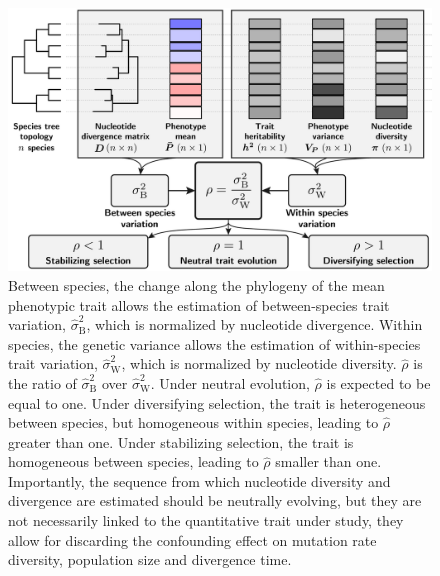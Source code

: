 \documentclass{article}
\newcommand{\RateBetween}{\sigma^2_{\mathrm{B}}}
\newcommand{\RateWhithin}{\sigma^2_{\mathrm{W}}}
\newcommand{\EstRateBetween}{\widehat{\sigma}^2_{\mathrm{B}}}
\newcommand{\EstRateWhithin}{\widehat{\sigma}^2_{\mathrm{W}}}
\newcommand{\NI}{\rho}
\newcommand{\EstNI}{\widehat{\rho}}
\providecommand{\DIFaddtex}[1]{{\protect\color{blue}\uwave{#1}}} %
\providecommand{\DIFdeltex}[1]{{\protect\color{red}\sout{#1}}}                      %
\providecommand{\DIFaddFL}[1]{\DIFadd{#1}} %
\providecommand{\DIFdelFL}[1]{\DIFdel{#1}} %
\providecommand{\DIFaddbeginFL}{} %
\providecommand{\DIFaddendFL}{} %
\providecommand{\DIFdelbeginFL}{} %
\providecommand{\DIFdelendFL}{} %
\providecommand{\DIFadd}[1]{\texorpdfstring{\DIFaddtex{#1}}{#1}} %
\providecommand{\DIFdel}[1]{\texorpdfstring{\DIFdeltex{#1}}{}} %
\newcommand{\DIFscaledelfig}{0.5}
\newlength{\DIFdelgraphicswidth} %
\newlength{\DIFdelgraphicsheight} %
\newcommand{\DIFaddincludegraphics}[2][]{{\color{blue}\fbox{\DIFOincludegraphics[#1]{#2}}}} %
\newcommand{\DIFdelincludegraphics}[2][]{%
\sbox{\DIFdelgraphicsbox}{\DIFOincludegraphics[#1]{#2}}%
\settoboxwidth{\DIFdelgraphicswidth}{\DIFdelgraphicsbox} %
\settoboxtotalheight{\DIFdelgraphicsheight}{\DIFdelgraphicsbox} %
\scalebox{\DIFscaledelfig}{%
\parbox[b]{\DIFdelgraphicswidth}{\usebox{\DIFdelgraphicsbox}\\[-\baselineskip] \rule{\DIFdelgraphicswidth}{0em}}\llap{\resizebox{\DIFdelgraphicswidth}{\DIFdelgraphicsheight}{%
\setlength{\unitlength}{\DIFdelgraphicswidth}%
\begin{picture}(1,1)%
\thicklines\linethickness{2pt} %
{\color[rgb]{1,0,0}\put(0,0){\framebox(1,1){}}}%
{\color[rgb]{1,0,0}\put(0,0){\line( 1,1){1}}}%
{\color[rgb]{1,0,0}\put(0,1){\line(1,-1){1}}}%
\end{picture}%
}\hspace*{3pt}}} %
} %
\DeclareRobustCommand{\DIFaddbeginFL}{\DIFOaddbeginFL \let\includegraphics\DIFaddincludegraphics} %
\DeclareRobustCommand{\DIFaddendFL}{\DIFOaddendFL \let\includegraphics\DIFOincludegraphics} %
\DeclareRobustCommand{\DIFdelbeginFL}{\DIFOdelbeginFL \let\includegraphics\DIFdelincludegraphics} %
\DeclareRobustCommand{\DIFdelendFL}{\DIFOaddendFL \let\includegraphics\DIFOincludegraphics} %
\begin{document}
\begin{figure}[!ht]
    \centering
    \includegraphics[width=\textwidth, page=1] {figure1}
    \caption{
        Between species, the change along the phylogeny of the mean phenotypic trait allows the estimation of between-species trait variation, \DIFdelbeginFL \DIFdelFL{$\EstRateBetween$}\DIFdelendFL \DIFaddbeginFL \DIFaddFL{$\RateBetween$}\DIFaddendFL , which is normalized by nucleotide divergence.
        Within species, the genetic variance allows the estimation of within-species trait variation, \DIFdelbeginFL \DIFdelFL{$\EstRateWhithin$}\DIFdelendFL \DIFaddbeginFL \DIFaddFL{$\RateWhithin$}\DIFaddendFL , which is  normalized by nucleotide diversity.
        \DIFdelbeginFL \DIFdelFL{$\EstNI$ }\DIFdelendFL \DIFaddbeginFL \DIFaddFL{$\NI$ }\DIFaddendFL is the ratio of \DIFdelbeginFL \DIFdelFL{$\EstRateBetween$ }\DIFdelendFL \DIFaddbeginFL \DIFaddFL{$\RateBetween$ }\DIFaddendFL over \DIFdelbeginFL \DIFdelFL{$\EstRateWhithin$}\DIFdelendFL \DIFaddbeginFL \DIFaddFL{$\RateWhithin$}\DIFaddendFL .
        Under neutral evolution, \DIFdelbeginFL \DIFdelFL{$\EstNI$ }\DIFdelendFL \DIFaddbeginFL \DIFaddFL{$\NI$ }\DIFaddendFL is expected to be equal to one.
        Under diversifying selection, the trait is heterogeneous between species, but homogeneous within species, leading to \DIFdelbeginFL \DIFdelFL{$\EstNI$ }\DIFdelendFL \DIFaddbeginFL \DIFaddFL{$\NI$ }\DIFaddendFL greater than one.
        Under stabilizing selection, the trait is homogeneous between species, leading to \DIFdelbeginFL \DIFdelFL{$\EstNI$ }\DIFdelendFL \DIFaddbeginFL \DIFaddFL{$\NI$ }\DIFaddendFL smaller than one.
        Importantly, the sequence from which nucleotide diversity and divergence are estimated should be neutrally evolving, but they are not necessarily linked to the quantitative trait under study, they allow for discarding the confounding effect on mutation rate diversity, population size and divergence time.
    }
    \label{fig:methods}
\end{figure}
\end{document}
